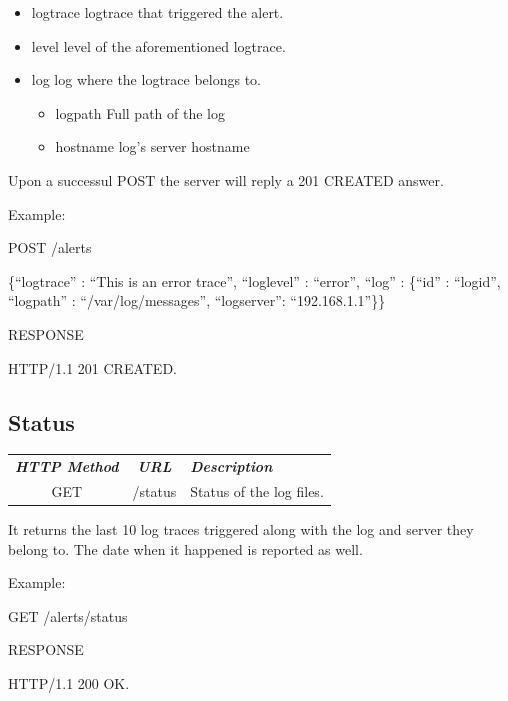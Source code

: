 \begin{itemize}
 \item logtrace logtrace that triggered the alert.
 \item level level of the aforementioned logtrace.
 \item log log where the logtrace belongs to.
    \begin{itemize}
      \item logpath Full path of the log 
      \item hostname log's server hostname
    \end{itemize}
\end{itemize}
Upon a successul POST the server will reply a 201 CREATED answer.

\noindent
Example:

\begin{codeexample}

POST /alerts

 \{``logtrace'' : ``This is an error trace'', 
   ``loglevel'' : ``error'',
   ``log'' : \{``id'' : ``logid'', ``logpath'' : ``/var/log/messages'', ``logserver'': ``192.168.1.1''\}\} 

RESPONSE

HTTP/1.1 201 CREATED.
\end{codeexample}

\subsection{Status}

\begin{flushleft}
 \begin{tabular}{|c|c|l|}
 \hline 
 \rowcolor{cyan} {\color{white} \textit{\textbf{HTTP Method}}} &  {\color{white} 
  \textit{\textbf{URL}}}  & {\color{white} 
 \textit{\textbf{Description}}}\\
 GET & /status & Status of the log files.\\
 \hline
\end{tabular}
\end{flushleft}
It returns the last 10 log traces triggered along with the log and server they belong to. The 
date when it happened is reported as well.

\noindent
Example:

\begin{codeexample}

GET /alerts/status

RESPONSE

HTTP/1.1 200 OK.
\end{codeexample}


